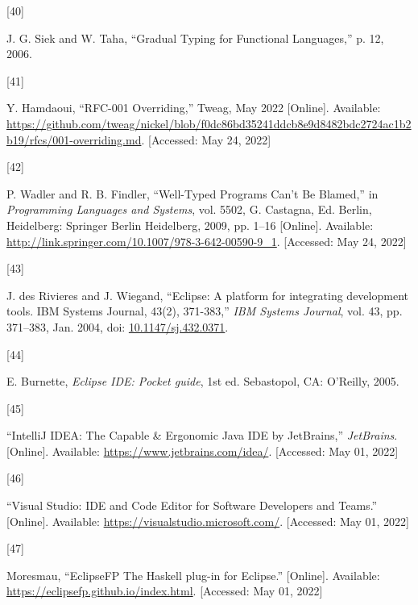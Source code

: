 \documentclass[
  a4paper,
  bibtex,
  english,
  nomenclature]{kthlatex/kththesis/kththesis}
\newlength{\cslhangindent}
\newlength{\csllabelwidth}
\newlength{\cslentryspacingunit} %
\newenvironment{CSLReferences}[2] %
 {%
  \setlength{\parindent}{0pt}
  \ifodd #1
  \let\oldpar\par
  \def\par{\hangindent=\cslhangindent\oldpar}
  \fi
  \setlength{\parskip}{#2\cslentryspacingunit}
 }%
 {}
\newcommand{\CSLLeftMargin}[1]{\parbox[t]{\csllabelwidth}{#1}}
\newcommand{\CSLRightInline}[1]{\parbox[t]{\linewidth - \csllabelwidth}{#1}\break}
\begin{document}
\begin{CSLReferences}{0}{0}
\leavevmode{}%
\CSLLeftMargin{{[}40{]} }
\CSLRightInline{J. G. Siek and W. Taha, {``Gradual {Typing} for
{Functional Languages},''} p. 12, 2006. }

\leavevmode{}%
\CSLLeftMargin{{[}41{]} }
\CSLRightInline{Y. Hamdaoui, {``{RFC-001 Overriding},''} {Tweag}, May
2022 {[}Online{]}. Available:
\url{https://github.com/tweag/nickel/blob/f0dc86bd35241ddcb8e9d8482bdc2724ac1b2b19/rfcs/001-overriding.md}.
{[}Accessed: May 24, 2022{]}}

\leavevmode{}%
\CSLLeftMargin{{[}42{]} }
\CSLRightInline{P. Wadler and R. B. Findler, {``Well-{Typed Programs
Can}'t {Be Blamed},''} in \emph{Programming {Languages} and {Systems}},
vol. 5502, G. Castagna, Ed. {Berlin, Heidelberg}: {Springer Berlin
Heidelberg}, 2009, pp. 1--16 {[}Online{]}. Available:
\url{http://link.springer.com/10.1007/978-3-642-00590-9_1}. {[}Accessed:
May 24, 2022{]}}

\leavevmode{}%
\CSLLeftMargin{{[}43{]} }
\CSLRightInline{J. des Rivieres and J. Wiegand, {``Eclipse: {A} platform
for integrating development tools. {IBM Systems Journal}, 43(2),
371-383,''} \emph{IBM Systems Journal}, vol. 43, pp. 371--383, Jan.
2004, doi:
\href{https://doi.org/10.1147/sj.432.0371}{10.1147/sj.432.0371}. }

\leavevmode{}%
\CSLLeftMargin{{[}44{]} }
\CSLRightInline{E. Burnette, \emph{Eclipse {IDE}: Pocket guide}, 1st ed.
{Sebastopol, CA}: {O'Reilly}, 2005. }

\leavevmode{}%
\CSLLeftMargin{{[}45{]} }
\CSLRightInline{{``{IntelliJ IDEA}: {The Capable} \& {Ergonomic Java
IDE} by {JetBrains},''} \emph{JetBrains}. {[}Online{]}. Available:
\url{https://www.jetbrains.com/idea/}. {[}Accessed: May 01, 2022{]}}

\leavevmode{}%
\CSLLeftMargin{{[}46{]} }
\CSLRightInline{{``Visual {Studio}: {IDE} and {Code Editor} for
{Software Developers} and {Teams}.''} {[}Online{]}. Available:
\url{https://visualstudio.microsoft.com/}. {[}Accessed: May 01, 2022{]}}

\leavevmode{}%
\CSLLeftMargin{{[}47{]} }
\CSLRightInline{Moresmau, {``{EclipseFP The Haskell} plug-in for
{Eclipse}.''} {[}Online{]}. Available:
\url{https://eclipsefp.github.io/index.html}. {[}Accessed: May 01,
2022{]}}


\end{CSLReferences}
\end{document}
